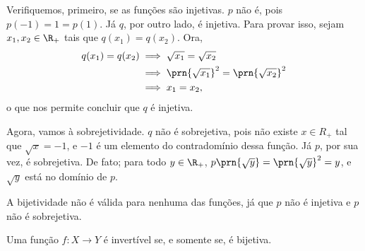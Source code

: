 \begin{solution}
    Verifiquemos, primeiro, se as funções são injetivas. $p$ não é, pois $p(-1)=1=p(1)$.
    Já $q$, por outro lado, é injetiva.
    Para provar isso, sejam $x_1, x_2 \in \R_+$ tais que $q(x_1)=q(x_2)$.
    Ora, 
    \begin{align*}
        q(x_1) = q(x_2) & \implies \sqrt{x_1} = \sqrt{x_2} \\ & \implies \prn{\sqrt{x_1}}^2 = \prn{\sqrt{x_2}}^2 \\ & \implies x_1 = x_2,
    \end{align*}
    o que nos permite concluir que $q$ é injetiva.

    Agora, vamos à sobrejetividade.
    $q$ não é sobrejetiva, pois não existe $x \in R_+$ tal que $\sqrt x = -1$, e $-1$ é um elemento do contradomínio dessa função.
    Já $p$, por sua vez, é sobrejetiva. 
    De fato; para todo $y \in \R_+$, $p\prn{\sqrt y} = \prn{\sqrt y}^2 = y$, e $\sqrt y$ está no domínio de $p$.

    A bijetividade não é válida para nenhuma das funções, já que $p$ não é injetiva e $p$ não é sobrejetiva.
\end{solution}

\begin{theorem}
    Uma função $f: X \to Y$ é invertível se, e somente se, é bijetiva.
\end{theorem}

